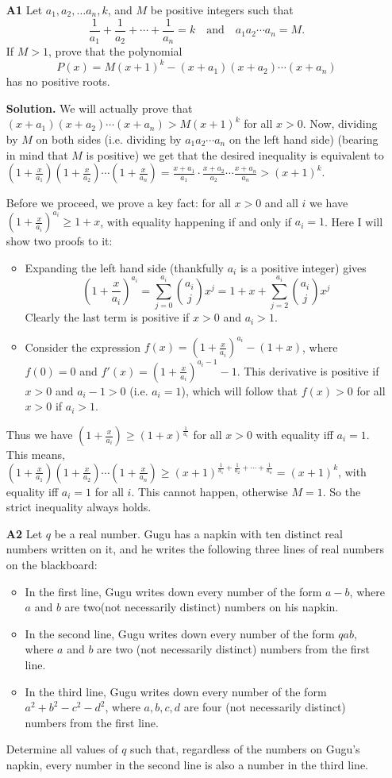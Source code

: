 \documentclass[11pt,a4paper]{article}
\begin{document}
\begin{enumerate}
	\item[\textbf{A1}]Let $a_1,a_2,\ldots a_n,k$, and $M$ be positive integers such that
	$$\frac{1}{a_1}+\frac{1}{a_2}+\cdots+\frac{1}{a_n}=k\quad\text{and}\quad a_1a_2\cdots a_n=M.$$If $M>1$, prove that the polynomial
	$$P(x)=M(x+1)^k-(x+a_1)(x+a_2)\cdots (x+a_n)$$has no positive roots.
	
	\textbf{Solution.} We will actually prove that $(x+a_1)(x+a_2)\cdots (x+a_n) > M(x+1)^k$ for all $x > 0$. 
	Now, dividing by $M$ on both sides (i.e. dividing by $a_1a_2\cdots a_n$ on the left hand side) (bearing in mind that $M$ is positive) we get that the desired inequality is equivalent to 
	$(1+\frac{x}{a_1})(1+\frac{x}{a_2})\cdots (1+\frac{x}{a_n}) = \frac{x+a_1}{a_1}\cdot\frac{x+a_2}{a_2}\cdots \frac{x+a_n}{a_n} > (x+1)^k$. 
	
	Before we proceed, we prove a key fact: for all $x > 0$ and all $i$ we have $(1+\frac{x}{a_i})^{a_i} \ge 1+x$, with equality happening if and only if $a_i = 1$. Here I will show two proofs to it: 
	\begin{itemize}
		\item Expanding the left hand side (thankfully $a_i$ is a positive integer) gives 
		\[(1+\frac{x}{a_i})^{a_i}=\sum_{j=0}^{a_i}\binom{a_i}{j}x^j=1+x+\sum_{j=2}^{a_i}\binom{a_i}{j}x^j\]
		Clearly the last term is positive if $x>0$ and $a_i>1$. 
		\item Consider the expression $f(x)=(1+\frac{x}{a_i})^{a_i} - (1+x)$, where $f(0)=0$ and $f'(x)=(1+\frac{x}{a_i})^{a_i-1}-1$. This derivative is positive if $x>0$ and $a_i-1>0$ (i.e. $a_i=1$), which will follow that $f(x)>0$ for all $x>0$ if $a_i>1$. 
	\end{itemize}
Thus we have $(1+\frac{x}{a_i}) \ge (1+x)^{\frac{1}{a_i}}$ for all $x>0$ with equality iff $a_i=1$. This means, 
$(1+\frac{x}{a_1})(1+\frac{x}{a_2})\cdots (1+\frac{x}{a_n}) \ge (x+1)^{\frac{1}{a_1}+\frac{1}{a_2}+\cdots + \frac{1}{a_n}}=(x+1)^k$, with equality iff $a_i=1$ for all $i$. This cannot happen, otherwise $M=1$. So the strict inequality always holds. 

\item [\textbf{A2}] Let $q$ be a real number. Gugu has a napkin with ten distinct real numbers written on it, and he writes the following three lines of real numbers on the blackboard:
	\begin{itemize}
		\item In the first line, Gugu writes down every number of the form $a-b$, where $a$ and $b$ are two(not necessarily distinct) numbers on his napkin.
		\item In the second line, Gugu writes down every number of the form $qab$, where $a$ and $b$ are
		two (not necessarily distinct) numbers from the first line.
		\item In the third line, Gugu writes down every number of the form $a^2+b^2-c^2-d^2$, where
		$a, b, c, d$ are four (not necessarily distinct) numbers from the first line.
	\end{itemize}
	Determine all values of $q$ such that, regardless of the numbers on Gugu's napkin, every number in the second line is also a number in the third line.
	

\end{enumerate}
\end{document}
